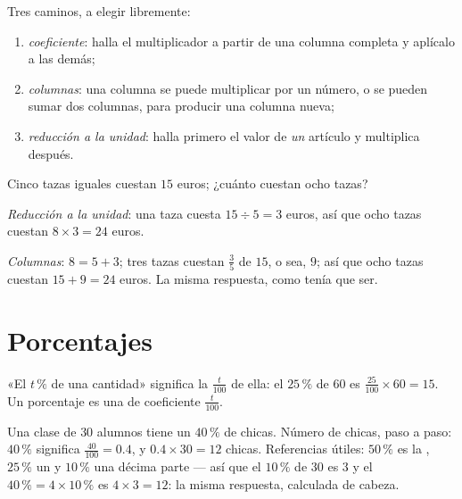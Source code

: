 \begin{method}\label{met:g6:propdata:complete}
Tres caminos, a elegir libremente:
\begin{enumerate}
  \item \emph{coeficiente}: halla el multiplicador a partir de una columna
        completa y aplícalo a las demás;
  \item \emph{columnas}: una columna se puede multiplicar por un número, o se pueden sumar
        dos columnas, para producir una columna nueva;
  \item \emph{reducción a la unidad}: halla primero el valor de \emph{un}
        artículo y multiplica después.
\end{enumerate}
\end{method}

\begin{example}\label{ex:g6:propdata:methods}
Cinco tazas iguales cuestan $15$ euros; ¿cuánto cuestan ocho tazas?

\emph{Reducción a la unidad}: una taza cuesta $15 \div 5 = 3$ euros, así que ocho
tazas cuestan $8 \times 3 = 24$ euros.

\emph{Columnas}: $8 = 5 + 3$; tres tazas cuestan $\frac{3}{5}$ de $15$,
o sea, $9$; así que ocho tazas cuestan $15 + 9 = 24$ euros. La misma respuesta, como
tenía que ser.
\end{example}

\section{Porcentajes}

\begin{definition}[Porcentaje]\label{def:g6:propdata:percent}
«El $t\,\%$ de una cantidad» significa la  $\frac{t}{100}$ de ella:
el $25\,\%$ de $60$ es $\frac{25}{100} \times 60 = 15$. Un porcentaje es una
 de coeficiente $\frac{t}{100}$.
\end{definition}

\begin{example}\label{ex:g6:propdata:percent}
Una clase de $30$ alumnos tiene un $40\,\%$ de chicas. Número de chicas, paso
a paso: $40\,\%$ significa $\frac{40}{100} = 0.4$, y
$0.4 \times 30 = 12$ chicas. Referencias útiles:
$50\,\%$ es la , $25\,\%$ un  y $10\,\%$ una décima parte ---
así que el $10\,\%$ de $30$ es $3$ y el $40\,\% = 4 \times 10\,\%$ es
$4 \times 3 = 12$: la misma respuesta, calculada de cabeza.
\end{example}

